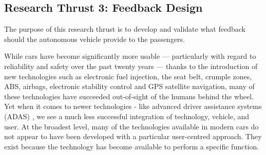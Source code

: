 \subsection{Research Thrust 3: Feedback Design}
\label{sec:feedback}


The purpose of this research thrust is to develop and validate what feedback should the autonomous vehicle provide to the passengers.



While cars have become significantly more usable — particularly with regard to reliability and safety over the past twenty years — thanks to the introduction of new technologies such as electronic fuel injection, the seat belt, crumple zones, ABS, airbags, electronic stability control and GPS satellite navigation, many of these technologies have succeeded out-of-sight of the humans behind the wheel.
Yet when it comes to newer technologies - like advanced driver assistance systems (ADAS) , we see a much less successful integration of technology, vehicle, and user.
At the broadest level, many of the technologies available in modern cars do not appear to have been developed with a particular user-centred approach. 
They exist because the technology has become available to perform a specific function.

